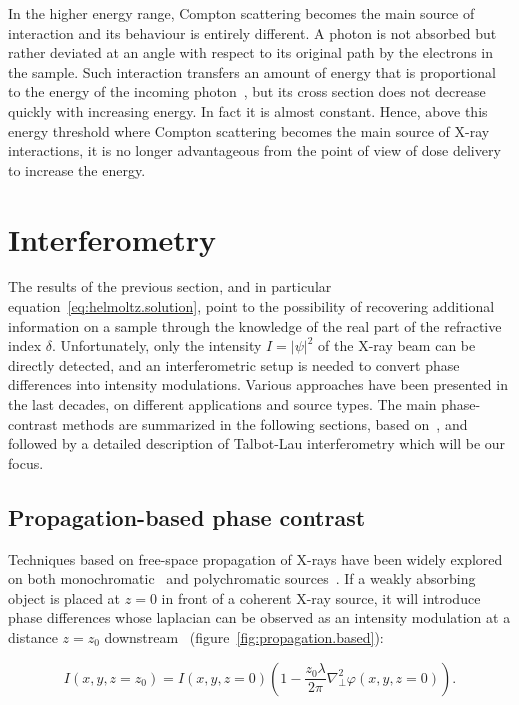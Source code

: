 In the higher energy range, Compton scattering becomes the main source of
interaction and its behaviour is entirely different. A photon is not
absorbed but rather deviated at an angle with respect to its original path
by the electrons in the sample. Such interaction transfers an amount of
energy that is proportional to the energy of the incoming
photon~\parencite{PhysRev.21.483}, but its cross section does not decrease
quickly with increasing energy. In fact it is almost constant. Hence, above
this energy threshold where Compton scattering becomes the main source of
X-ray interactions, it is no longer advantageous from the point of view of
dose delivery to increase the energy.

\section{Interferometry}
The results of the previous section, and in particular
equation~\eqref{eq:helmoltz.solution}, point to the possibility of recovering
additional information on a sample through the knowledge of the real part of
the refractive index $\delta$. Unfortunately, only the intensity $I =
|\psi|^2$ of the X-ray beam can be directly detected, and an interferometric
setup is needed to convert phase differences into intensity modulations.
Various approaches have been presented in the last decades, on different
applications and source types. The main phase-contrast methods are summarized in the
following sections, based on~\cite{2018NIMPA.878...88E}, and followed by a detailed
description of Talbot-Lau interferometry which will be our focus.

\subsection{Propagation-based phase contrast}
Techniques based on free-space propagation of X-rays have been widely
explored on both monochromatic~\parencite{1995RScI...66.5486S,Cloetens1996}
and polychromatic sources~\parencite{Wilkins1996}. If a weakly
absorbing object is placed at $z=0$ in front of a coherent X-ray source,
it will introduce phase differences whose laplacian can be observed as an
intensity modulation at a distance $z=z_0$
downstream~\parencite{Paganin2006b-propagation-based}
(figure~\ref{fig:propagation.based}):

\begin{equation}
    I(x, y, z = z_0) = I(x, y, z=0)\left(1 - \frac{z_0\lambda}{2\pi}\nabla_\perp^2
    \varphi(x, y, z=0)\right).
    \label{eq:free.space.propagation}
\end{equation}


